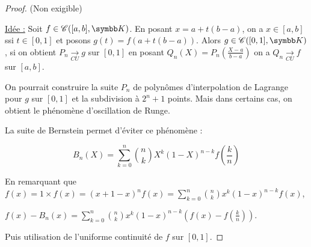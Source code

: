 \begin{proof}
    (Non exigible) 

    \uline{Idée :} Soit $f \in \mathscr C([a, b], \K)$. En posant $x = a + t (b - a)$, on a 
    $x \in [a, b]$ ssi $t \in [0, 1]$ et posons $g(t) = f(a + t (b - a))$. 
    Alors $g \in \mathscr C([0, 1], \K)$, si on obtient $P_n \xrightarrow[CU]{} g$ sur $[0, 1]$
    en posant $Q_n(X) = P_n \left( \frac{X - a}{b - a} \right)$ on a $Q_n \xrightarrow[CU]{} f$ sur $[a, b]$.

    On pourrait construire la suite $P_n$ de polynômes d'interpolation de Lagrange pour 
    $g$ sur $[0, 1]$ et la subdivision à $2^{n} + 1$ points. Mais dans certains cas, on obtient 
    le phénomène d'oscillation de Runge.

    La suite de Bernstein permet d'éviter ce phénomène :

    \[B_n(X) = \sum_{k = 0}^{n} \binom{n}{k} X^k (1 - X)^{n - k} f\left( \frac k n \right)\]

    En remarquant que $\displaystyle f(x) = 1 \times f(x) = (x + 1 - x)^n f(x) = \sum_{k = 0}^{n} \binom{n}{k} x^k (1 - x)^{n - k} f(x)$,

    $\displaystyle f(x) - B_n(x) = \sum_{k = 0}^{n} \binom{n}{k} x^k (1 - x)^{n - k} \left( f(x) - f\left( \frac k n \right) \right)$.

    Puis utilisation de l'uniforme continuité de $f$ sur $[0, 1]$.
\end{proof}


